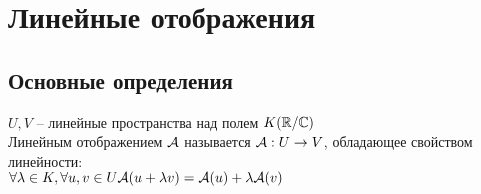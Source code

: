 \documentclass[../spring.tex]{subfiles}
\begin{document}
	\section{Линейные отображения}
	
	\subsection{Основные определения}
	\begin{defin}
		$U, V$ -- линейные пространства над полем $K(\mathbb R/ \mathbb{C})$\\
		Линейным отображением $\mathcal{A}$ называется $\mathcal{A}: U \rightarrow V$, обладающее свойством линейности:\\
		$\forall \lambda \in K, \forall u, v \in U\\ 
		\mathcal{A}(u + \lambda v) = \mathcal{A}(u) + \lambda \mathcal{A}(v)$
	\end{defin}
	
\end{document}
